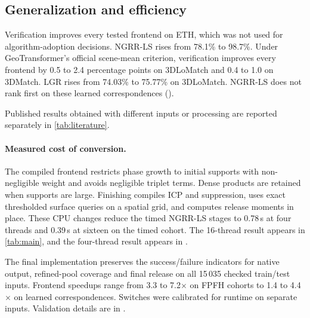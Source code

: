 \subsection{Generalization and efficiency}
\label{sec:cost}
Verification improves every tested frontend on ETH, which was not used for algorithm-adoption decisions. NGRR-LS rises from 78.1\% to 98.7\%. Under GeoTransformer's official scene-mean criterion, verification improves every frontend by 0.5 to 2.4 percentage points on 3DLoMatch and 0.4 to 1.0 on 3DMatch. LGR rises from 74.03\% to 75.77\% on 3DLoMatch. NGRR-LS does not rank first on these learned correspondences ().

Published results obtained with different inputs or processing are reported separately in \cref{tab:literature}.

\paragraph{Measured cost of conversion.}
The compiled frontend restricts phase growth to initial supports with non-negligible weight and avoids negligible triplet terms. Dense products are retained when supports are large. Finishing compiles ICP and suppression, uses exact thresholded surface queries on a spatial grid, and computes release moments in place. These CPU changes reduce the timed NGRR-LS stages to 0.78\,s at four threads and 0.39\,s at sixteen on the timed cohort. The 16-thread result appears in \cref{tab:main}, and the four-thread result appears in .

The final implementation preserves the success/failure indicators for native output, refined-pool coverage and final release on all 15\,035 checked train/test inputs. Frontend speedups range from 3.3 to 7.2$\times$ on FPFH cohorts to 1.4 to 4.4$\times$ on learned correspondences. Switches were calibrated for runtime on separate inputs. Validation details are in .

